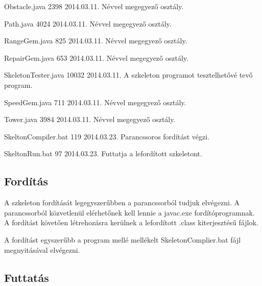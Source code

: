 \begin{fajllista}
\fajl
{Obstacle.java}
{2398}
{2014.03.11.}
{Névvel megegyező osztály.}

\fajl
{Path.java}
{4024}
{2014.03.11.}
{Névvel megegyező osztály.}

\fajl
{RangeGem.java}
{825}
{2014.03.11.}
{Névvel megegyező osztály.}

\fajl
{RepairGem.java}
{653}
{2014.03.11.}
{Névvel megegyező osztály.}

\fajl
{SkeletonTester.java}
{10032}
{2014.03.11.}
{A szkeleton programot tesztelhetővé tevő program.}

\fajl
{SpeedGem.java}
{711}
{2014.03.11.}
{Névvel megegyező osztály.}

\fajl
{Tower.java}
{3984}
{2014.03.11.}
{Névvel megegyező osztály.}

\fajl
{SkeltonCompiler.bat}
{119}
{2014.03.23.}
{Parancssoros fordítást végzi.}

\fajl
{SkeltonRun.bat}
{97}
{2014.03.23.}
{Futtatja a lefordított szkeletont.}

\end{fajllista}

\subsection{Fordítás}


A szkeleton fordítását legegyszerűbben a parancssorból tudjuk elvégezni. A parancssorból közvetlenül elérhetőnek kell lennie a javac.exe fordítóprogramnak. A fordítást követően létrehozásra kerülnek a lefordított .class kiterjesztésű fájlok.

A fordítást egyszerűbb a program mellé mellékelt SkeletonComplier.bat fájl megnyitásával elvégezni.

\subsection{Futtatás}


